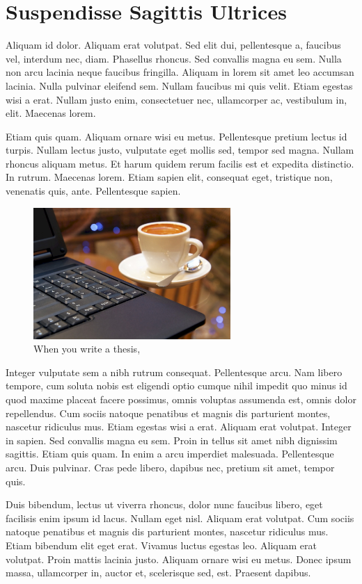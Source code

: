 \section{Suspendisse Sagittis Ultrices}
Aliquam id dolor. Aliquam erat volutpat. Sed elit dui, pellentesque a, faucibus vel, interdum nec, diam. Phasellus rhoncus. Sed convallis magna eu sem. Nulla non arcu lacinia neque faucibus fringilla. Aliquam in lorem sit amet leo accumsan lacinia. Nulla pulvinar eleifend sem. Nullam faucibus mi quis velit. Etiam egestas wisi a erat. Nullam justo enim, consectetuer nec, ullamcorper ac, vestibulum in, elit. Maecenas lorem.

Etiam quis quam. Aliquam ornare wisi eu metus. Pellentesque pretium lectus id turpis. Nullam lectus justo, vulputate eget mollis sed, tempor sed magna. Nullam rhoncus aliquam metus. Et harum quidem rerum facilis est et expedita distinctio. In rutrum. Maecenas lorem. Etiam sapien elit, consequat eget, tristique non, venenatis quis, ante. Pellentesque sapien.

\begin{figure}
	\centering
	\includegraphics[width=75mm]{Figures/CoffeeAndComputer.jpg}
	\caption{When you write a thesis, \cite{AhDTEmY2CY7Qv65e}}
	\label{fig:WritingThesis}
\end{figure}

Integer vulputate sem a nibh rutrum consequat. Pellentesque arcu. Nam libero tempore, cum soluta nobis est eligendi optio cumque nihil impedit quo minus id quod maxime placeat facere possimus, omnis voluptas assumenda est, omnis dolor repellendus. Cum sociis natoque penatibus et magnis dis parturient montes, nascetur ridiculus mus. Etiam egestas wisi a erat. Aliquam erat volutpat. Integer in sapien. Sed convallis magna eu sem. Proin in tellus sit amet nibh dignissim sagittis. Etiam quis quam. In enim a arcu imperdiet malesuada. Pellentesque arcu. Duis pulvinar. Cras pede libero, dapibus nec, pretium sit amet, tempor quis.

Duis bibendum, lectus ut viverra rhoncus, dolor nunc faucibus libero, eget facilisis enim ipsum id lacus. Nullam eget nisl. Aliquam erat volutpat. Cum sociis natoque penatibus et magnis dis parturient montes, nascetur ridiculus mus. Etiam bibendum elit eget erat. Vivamus luctus egestas leo. Aliquam erat volutpat. Proin mattis lacinia justo. Aliquam ornare wisi eu metus. Donec ipsum massa, ullamcorper in, auctor et, scelerisque sed, est. Praesent dapibus.

